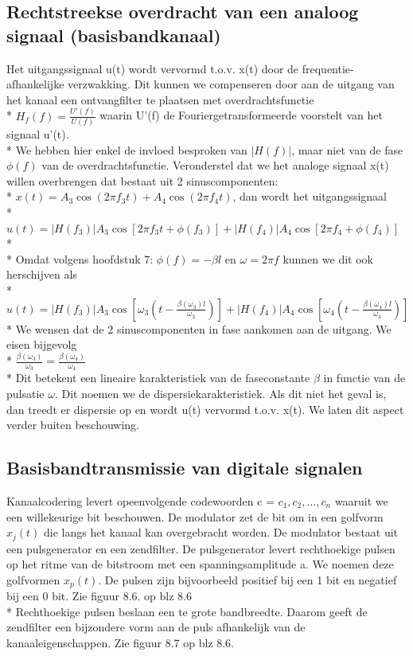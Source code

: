\documentclass[10pt]{article}
\begin{document}
\subsection{Rechtstreekse overdracht van een analoog signaal (basisbandkanaal)}
Het uitgangssignaal u(t) wordt vervormd t.o.v. x(t) door de frequentie-afhankelijke verzwakking. Dit kunnen we compenseren door aan de uitgang van het kanaal een ontvangfilter te plaatsen met overdrachtsfunctie\\*
$H_f(f) = \frac{U'(f)}{U(f)}$ waarin U'(f) de Fouriergetransformeerde voorstelt van het signaal u'(t).\\*
We hebben hier enkel de invloed besproken van $|H(f)|$, maar niet van de fase $\phi(f)$ van de overdrachtsfunctie. Veronderstel dat we het analoge signaal x(t) willen overbrengen dat bestaat uit 2 sinuscomponenten:\\*
$x(t) = A_3\cos{(2\pi f_3t)} + A_4\cos{(2\pi f_4t)}$, dan wordt het uitgangssignaal\\*
$u(t) = |H(f_3)|A_3\cos{\left[2\pi f_3t+\phi(f_3)\right]} + |H(f_4)|A_4\cos{\left[2\pi f_4 + \phi(f_4)\right]}$\\*\\*
Omdat volgens hoofdstuk 7: $\phi(f) = -\beta l$ en $\omega = 2\pi f$ kunnen we dit ook herschijven als\\*
$u(t) = |H(f_3)|A_3\cos{\left[\omega_3\left(t-\frac{\beta(\omega_3)l}{\omega_3}\right)\right]} + |H(f_4)|A_4\cos{\left[\omega_4\left(t - \frac{\beta(\omega_4)l}{\omega_4}\right)\right]}$\\*
We wensen dat de 2 sinuscomponenten in fase aankomen aan de uitgang. We eisen bijgevolg\\*
$\frac{\beta(\omega_3)}{\omega_3} = \frac{\beta(\omega_4)}{\omega_4}$\\*
Dit betekent een lineaire karakteristiek van de faseconstante $\beta$ in functie van de pulsatie $\omega$. Dit noemen we de dispersiekarakteristiek. Als dit niet het geval is, dan treedt er dispersie op en wordt u(t) vervormd t.o.v. x(t). We laten dit aspect verder buiten beschouwing.
\subsection{Basisbandtransmissie van digitale signalen}
Kanaalcodering levert opeenvolgende codewoorden c = {$c_1, c_2, \dots, c_n$} waaruit we een willekeurige bit beschouwen. De modulator zet de bit om in een golfvorm $x_j(t)$ die langs het kanaal kan overgebracht worden. De modulator bestaat uit een pulsgenerator en een zendfilter. De pulsgenerator levert rechthoekige pulsen op het ritme van de bitstroom met een spanningsamplitude a. We noemen deze golfvormen $x_p(t)$. De pulsen zijn bijvoorbeeld positief bij een 1 bit en negatief bij een 0 bit. {\scriptsize Zie figuur 8.6. op blz 8.6}\\*
Rechthoekige pulsen beslaan een te grote bandbreedte. Daarom geeft de zendfilter een bijzondere vorm aan de puls afhankelijk van de kanaaleigenschappen. {\scriptsize Zie figuur 8.7 op blz 8.6.}
\end{document}
